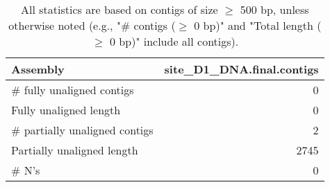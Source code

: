 \documentclass[12pt,a4paper]{article}
\begin{document}
\begin{table}[ht]
\begin{center}
\caption{All statistics are based on contigs of size $\geq$ 500 bp, unless otherwise noted (e.g., "\# contigs ($\geq$ 0 bp)" and "Total length ($\geq$ 0 bp)" include all contigs).}
\begin{tabular}{|l*{1}{|r}|}
\hline
Assembly & site\_D1\_DNA.final.contigs \\ \hline
\# fully unaligned contigs & 0 \\ \hline
Fully unaligned length & 0 \\ \hline
\# partially unaligned contigs & 2 \\ \hline
Partially unaligned length & 2745 \\ \hline
\# N's & 0 \\ \hline
\end{tabular}
\end{center}
\end{table}
\end{document}
